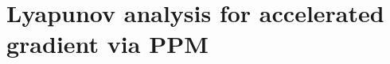 \documentclass[12pt]{article}
\begin{document}
\section{Lyapunov analysis for accelerated gradient via PPM}
\label{sec:generic_ag_ppm_lyapunov_analysis}
\end{document}

